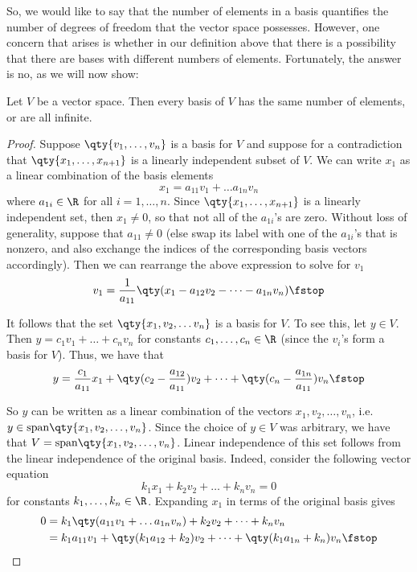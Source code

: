So, we would like to say that the number of elements in a basis quantifies the number of degrees of freedom that the vector space possesses. However, one concern that arises is whether in our definition above that there is a possibility that there are bases with different numbers of elements. Fortunately, the answer is no, as we will now show:
\begin{theorem}
  \label{thm:dim}
  Let \( V \) be a vector space. Then every basis of \( V \) has the same number of elements, or are all infinite.
\end{theorem}
\begin{proof}
  Suppose \( \qty{v_1,\dots ,v_n} \) is a basis for \( V \) and suppose for a contradiction that \( \qty{x_1,\dots, x_{n+1}} \) is a linearly independent subset of \( V \). We can write \( x_1 \) as a linear combination of the basis elements
  \[ x_1=a_{11}v_1+\dots a_{1n}v_n \]
  where \( a_{1i}\in\R \) for all \( i=1,\dots, n \). Since \(\qty{x_1,\dots, x_{n+1}}  \) is a linearly independent set, then \( x_1\neq 0 \), so that not all of the \( a_{1i} \)'s are zero. Without loss of generality, suppose that \( a_{11}\neq 0 \) (else swap its label with one of the \( a_{1i} \)'s that is nonzero, and also exchange the indices of the corresponding basis vectors accordingly). Then we can rearrange the above expression to solve for \( v_1 \)
  \[ v_1=\frac{1}{a_{11}}\qty(x_1-a_{12}v_2-\dots-a_{1n}v_n)\fstop \]
  
  It follows that the set \( \qty{x_1,v_2,\dots v_n} \) is a basis for \( V \). To see this, let \( y\in V \). Then \( y=c_1v_1+\dots +c_nv_n \) for constants \( c_1,\dots,c_n\in\R \) (since the \( v_i \)'s form a basis for \( V \)). Thus, we have that
  \[ y=\frac{c_1}{a_{11}}x_1+\qty(c_2-\frac{a_{12}}{a_{11}})v_2+\dots+\qty(c_n-\frac{a_{1n}}{a_{11}})v_n\fstop \]
  
  So \( y \) can be written as a linear combination of the vectors \( x_1,v_2,\dots,v_n \), i.e.\ \( y\in\text{span}\qty{x_1,v_2,\dots,v_n} \). Since the choice of \( y\in V \) was arbitrary, we have that \( V=\text{span}\qty{x_1,v_2,\dots,v_n} \). Linear independence of this set follows from the linear independence of the original basis. Indeed, consider the following vector equation
  \[ k_1x_1+k_2v_2+\dots+k_nv_n=0 \]
  for constants \( k_1,\dots,k_n\in\R \). Expanding \( x_1 \) in terms of the original basis gives
  \begin{align*}
    0&= k_1\qty(a_{11}v_1+\dots a_{1n}v_n)+k_2v_2+\dots+k_nv_n\\
    &= k_1a_{11}v_1+\qty(k_1a_{12}+k_2)v_2+\dots+\qty(k_1a_{1n}+k_n)v_n\fstop
  \end{align*}
  

\end{proof}

